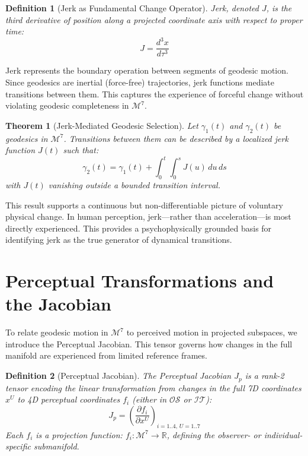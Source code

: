 \documentclass{article}
\newtheorem{definition}{Definition}
\newtheorem{theorem}{Theorem}
\begin{document}
\begin{definition}[Jerk as Fundamental Change Operator]
Jerk, denoted $J$, is the third derivative of position along a projected coordinate axis with respect to proper time:
\begin{equation}
J = \frac{d^3x}{d\tau^3}
\end{equation}
\end{definition}

Jerk represents the boundary operation between segments of geodesic motion. Since geodesics are inertial (force-free) trajectories, jerk functions mediate transitions between them. This captures the experience of forceful change without violating geodesic completeness in $\mathcal{M}^7$.

\begin{theorem}[Jerk-Mediated Geodesic Selection]
Let $\gamma_1(t)$ and $\gamma_2(t)$ be geodesics in $\mathcal{M}^7$. Transitions between them can be described by a localized jerk function $J(t)$ such that:
\begin{equation}
\gamma_2(t) = \gamma_1(t) + \int_0^t \int_0^s J(u) \, du \, ds
\end{equation}
with $J(t)$ vanishing outside a bounded transition interval.
\end{theorem}

This result supports a continuous but non-differentiable picture of voluntary physical change. In human perception, jerk—rather than acceleration—is most directly experienced. This provides a psychophysically grounded basis for identifying jerk as the true generator of dynamical transitions.

\section{Perceptual Transformations and the Jacobian}

To relate geodesic motion in $\mathcal{M}^7$ to perceived motion in projected subspaces, we introduce the Perceptual Jacobian. This tensor governs how changes in the full manifold are experienced from limited reference frames.

\begin{definition}[Perceptual Jacobian]
The Perceptual Jacobian $J_p$ is a rank-2 tensor encoding the linear transformation from changes in the full 7D coordinates $x^U$ to 4D perceptual coordinates $f_i$ (either in $\mathcal{OS}$ or $\mathcal{IT}$):
\begin{equation}
J_p = \left(\frac{\partial f_i}{\partial x^U}\right)_{i=1..4,\,U=1..7}
\end{equation}
Each $f_i$ is a projection function: $f_i: \mathcal{M}^7 \rightarrow \mathbb{R}$, defining the observer- or individual-specific submanifold.
\end{definition}
\end{document}
